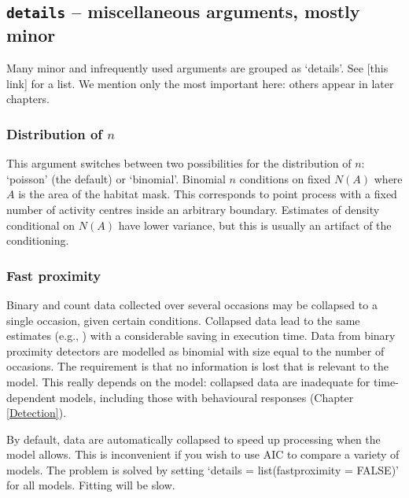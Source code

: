 \documentclass[
]{book}
\begin{document}
\subsection{\texorpdfstring{\texttt{details} -- miscellaneous arguments, mostly minor}{details -- miscellaneous arguments, mostly minor}}\label{details}


Many minor and infrequently used arguments are grouped as `details'. See {[}this link{]} for a list. We mention only the most important here: others appear in later chapters.

\subsubsection{\texorpdfstring{Distribution of \(n\)}{Distribution of n}}\label{distribution-of-n}


This argument switches between two possibilities for the distribution of \(n\): `poisson' (the default) or `binomial'. Binomial \(n\) conditions on fixed \(N(A)\) where \(A\) is the area of the habitat mask. This corresponds to point process with a fixed number of activity centres inside an arbitrary boundary. Estimates of density conditional on \(N(A)\) have lower variance, but this is usually an artifact of the conditioning.

\subsubsection{Fast proximity}\label{fast-proximity}


Binary and count data collected over several occasions may be collapsed to a single occasion, given certain conditions. Collapsed data lead to the same estimates (e.g., \citet{edb09}) with a considerable saving in execution time. Data from binary proximity detectors are modelled as binomial with size equal to the number of occasions. The requirement is that no information is lost that is relevant to the model. This really depends on the model: collapsed data are inadequate for time-dependent models, including those with behavioural responses (Chapter \ref{Detection}).

By default, data are automatically collapsed to speed up processing when the model allows. This is inconvenient if you wish to use AIC to compare a variety of models. The problem is solved by setting `details = list(fastproximity = FALSE)' for all models. Fitting will be slow.
\end{document}
